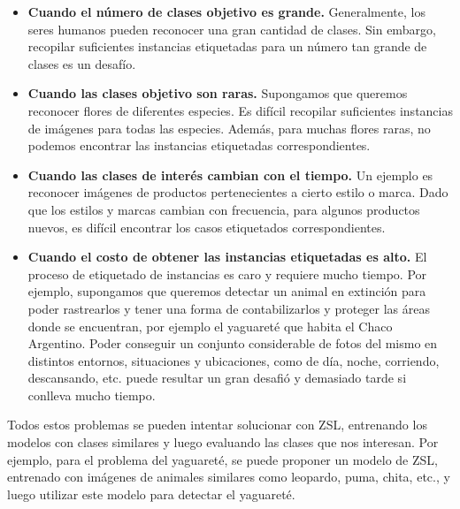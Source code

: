 \begin{itemize}
	\item \textbf{Cuando el número de clases objetivo es grande.} Generalmente, los seres humanos pueden reconocer una gran cantidad de clases. Sin embargo, recopilar suficientes instancias etiquetadas para un número tan grande de clases es un desafío.
	
	\item \textbf{Cuando las clases objetivo son raras.} Supongamos que queremos reconocer flores de diferentes especies. Es difícil recopilar suficientes instancias de imágenes para todas las especies. Además, para muchas flores raras, no podemos encontrar las instancias etiquetadas correspondientes.
	
	\item \textbf{Cuando las clases de interés cambian con el tiempo.} Un ejemplo es reconocer imágenes de productos pertenecientes a cierto estilo o marca. Dado que los estilos y marcas cambian con frecuencia, para algunos productos nuevos, es difícil encontrar los casos etiquetados correspondientes.
	
	\item \textbf{Cuando el costo de obtener las instancias etiquetadas es alto.} El proceso de etiquetado de instancias es caro y requiere mucho tiempo. Por ejemplo, supongamos que queremos detectar un animal en extinción para poder rastrearlos y tener una forma de contabilizarlos y proteger las áreas donde se encuentran, por ejemplo el yaguareté que habita el Chaco Argentino. Poder conseguir un conjunto considerable de fotos del mismo en distintos entornos, situaciones y ubicaciones, como de día, noche, corriendo, descansando, etc. puede resultar un gran desafió y demasiado tarde si conlleva mucho tiempo.
\end{itemize}

Todos estos problemas se pueden intentar solucionar con ZSL, entrenando los modelos con clases similares y luego evaluando las clases que nos interesan. Por ejemplo, para el problema del  yaguareté, se puede proponer un modelo de ZSL, entrenado con imágenes de animales similares como leopardo, puma, chita, etc., y luego utilizar este modelo para detectar el yaguareté.\\
 
